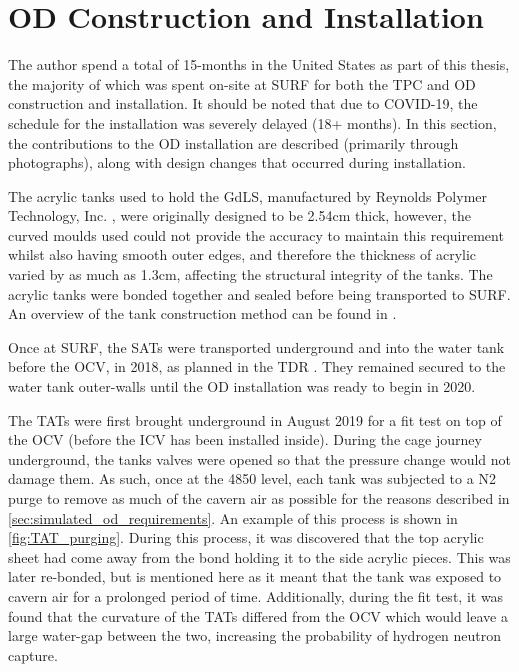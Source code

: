 \section{OD Construction and Installation} \label{sec:od_construction_sec}

\par
The author spend a total of 15-months in the United States as part of this thesis, the majority of which was spent on-site at SURF for both the TPC and OD construction and installation.
It should be noted that due to COVID-19, the schedule for the installation was severely delayed (18+ months).
In this section, the contributions to the OD installation are described (primarily through photographs), along with design changes that occurred during installation.

\par
The acrylic tanks used to hold the GdLS, manufactured by Reynolds Polymer Technology, Inc. \cite{reynolds_acrlyic_ref}, were originally designed to be 2.54cm thick, however, the curved moulds used could not provide the accuracy to maintain this requirement whilst also having smooth outer edges, and therefore the thickness of acrylic varied by as much as 1.3cm, affecting the structural integrity of the tanks.
The acrylic tanks were bonded together and sealed before being transported to SURF.
An overview of the tank construction method can be found in \cite{scotthaselschwardt_thesis_ref}.

\par
Once at SURF, the SATs were transported underground and into the water tank before the OCV, in 2018, as planned in the TDR \cite{LZ_TechnicalDesignReview_ref}.
They remained secured to the water tank outer-walls until the OD installation was ready to begin in 2020. 

\par
The TATs were first brought underground in August 2019 for a fit test on top of the OCV (before the ICV has been installed inside).
During the cage journey underground, the tanks valves were opened so that the pressure change would not damage them.
As such, once at the 4850 level, each tank was subjected to a N2 purge to remove as much of the cavern air as possible for the reasons described in \autoref{sec:simulated_od_requirements}.
An example of this process is shown in \autoref{fig:TAT_purging}.
During this process, it was discovered that the top acrylic sheet had come away from the bond holding it to the side acrylic pieces.
This was later re-bonded, but is mentioned here as it meant that the tank was exposed to cavern air for a prolonged period of time.
Additionally, during the fit test, it was found that the curvature of the TATs differed from the OCV which would leave a large water-gap between the two, increasing the probability of hydrogen neutron capture.

